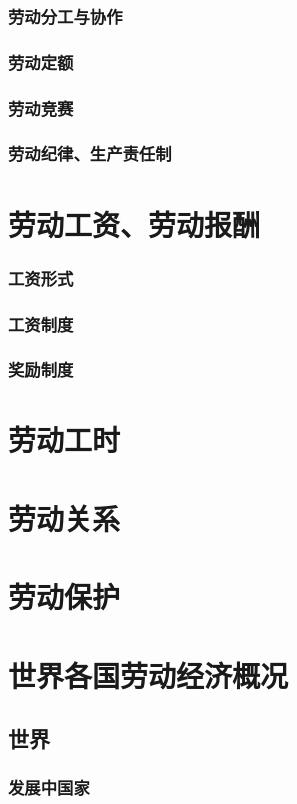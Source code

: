 \documentclass[UTF8]{../../RepresentationUniverse}
\begin{document}
    \subsubsection{劳动分工与协作}
    \subsubsection{劳动定额}
    \subsubsection{劳动竞赛}
    \subsubsection{劳动纪律、生产责任制}
\section{劳动工资、劳动报酬}
    \subsubsection{工资形式}
    \subsubsection{工资制度}
    \subsubsection{奖励制度}
\section{劳动工时}
\section{劳动关系}
\section{劳动保护}
\section{世界各国劳动经济概况}
    \subsection{世界}
        \subsubsection{发展中国家}
\end{document}

